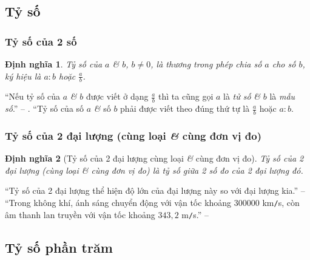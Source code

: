 \documentclass[oneside]{book}
\numberwithin{equation}{section}
\newtheorem{dinhnghia}{Định nghĩa}[section]
\begin{document}
\subsection{Tỷ số}

\subsubsection{Tỷ số của 2 số}
\begin{dinhnghia}
	 \emph{Tỷ số} của $a$ \textit{\&} $b$, $b\ne 0$, là thương trong phép chia số $a$ cho số $b$, ký hiệu là $a:b$ hoặc $\frac{a}{b}$.
\end{dinhnghia}
``Nếu tỷ số của $a$ \textit{\&} $b$ được viết ở dạng $\frac{a}{b}$ thì ta cũng gọi $a$ là \textit{tử số} \textit{\&} $b$ là \textit{mẫu số}.'' -- \cite[p. 61]{Thai_Anh_Dat_Ha_Loan_Nam_Quang_Toan_6_tap_2}. ``Tỷ số của số $a$ \textit{\&} số $b$ phải được viết theo đúng thứ tự là $\frac{a}{b}$ hoặc $a:b$.

\subsubsection{Tỷ số của 2 đại lượng (cùng loại \textit{\&} cùng đơn vị đo)}
\begin{dinhnghia}[Tỷ số của 2 đại lượng cùng loại \textit{\&} cùng đơn vị đo]
	\emph{Tỷ số của 2 đại lượng (cùng loại \textit{\&} cùng đơn vị đo)} là tỷ số giữa 2 số đo của 2 đại lượng đó.
\end{dinhnghia}
``Tỷ số của 2 đại lượng thể hiện độ lớn của đại lượng này so với đại lượng kia.'' -- \cite[p. 62]{Thai_Anh_Dat_Ha_Loan_Nam_Quang_Toan_6_tap_2} ``Trong không khí, ánh sáng chuyển động với vận tốc khoảng $300 000$ km\texttt{/}s, còn âm thanh lan truyền với vận tốc khoảng $343,2$ m\texttt{/}s.'' -- \cite[p. 63]{Thai_Anh_Dat_Ha_Loan_Nam_Quang_Toan_6_tap_2}

\subsection{Tỷ số phần trăm}
\end{document}
